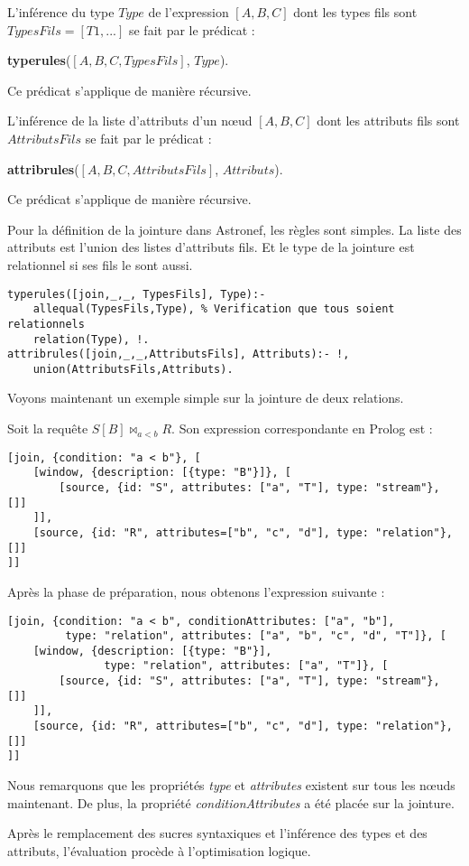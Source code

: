 \begin{regle}
L'inférence du type $Type$ de l'expression $[A,B,C]$ dont les types fils sont $TypesFils=[T1,...]$ se fait par le prédicat :
\begin{center} \textbf{typerules}($[A,B,C,TypesFils]$, $Type$).\end{center}
Ce prédicat s'applique de manière récursive.
\end{regle}

\begin{regle}
L'inférence de la liste d'attributs d'un nœud $[A,B,C]$ dont les attributs fils sont $AttributsFils$ se fait par le prédicat :
\begin{center} \textbf{attribrules}($[A,B,C,AttributsFils]$, $Attributs$).\end{center}
Ce prédicat s'applique de manière récursive.
\end{regle}

\begin{example}
	Pour la définition de la jointure dans Astronef, les règles sont simples. La liste des attributs est l'union des listes d'attributs fils. Et le type de la jointure est relationnel si ses fils le sont aussi.
	\begin{lstlisting}
typerules([join,_,_, TypesFils], Type):- 
	allequal(TypesFils,Type), % Verification que tous soient relationnels 
	relation(Type), !.
attribrules([join,_,_,AttributsFils], Attributs):- !, 
	union(AttributsFils,Attributs).
	\end{lstlisting}
\end{example}

Voyons maintenant un exemple simple sur la jointure de deux relations.
\begin{example}
	Soit la requête $S[B] \Join_{a < b} R$. Son expression correspondante en Prolog est :
	\begin{lstlisting}
[join, {condition: "a < b"}, [
	[window, {description: [{type: "B"}]}, [
		[source, {id: "S", attributes: ["a", "T"], type: "stream"}, []]
	]],
	[source, {id: "R", attributes=["b", "c", "d"], type: "relation"}, []]
]]
	\end{lstlisting}
	Après la phase de préparation, nous obtenons l'expression suivante :
	\begin{lstlisting}
[join, {condition: "a < b", conditionAttributes: ["a", "b"], 
		 type: "relation", attributes: ["a", "b", "c", "d", "T"]}, [
	[window, {description: [{type: "B"}], 
			   type: "relation", attributes: ["a", "T"]}, [
		[source, {id: "S", attributes: ["a", "T"], type: "stream"}, []]
	]],
	[source, {id: "R", attributes=["b", "c", "d"], type: "relation"}, []]
]]
	\end{lstlisting}
	Nous remarquons que les propriétés \textit{type} et \textit{attributes} existent sur tous les nœuds maintenant. De plus, la propriété \textit{conditionAttributes} a été placée sur la jointure.
\end{example}
Après le remplacement des sucres syntaxiques et l'inférence des types et des attributs, l'évaluation procède à l'optimisation logique.
